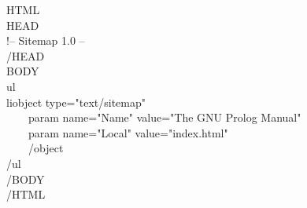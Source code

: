 \documentclass{article}
\newcommand{\Tag}[1]{{\lt}#1{\gt}}
\renewenvironment{tocenv}{\Tag{ul}\\}{\Tag{/ul}\\}
\newcommand{\OneEntry}[2]{%
\Tag{li}\Tag{object type="text/sitemap"}\\%
~~~~\Tag{param name="Name" value="{\def\\{}#2}"}\\%
~~~~\Tag{param name="Local" value="#1"}\\%
~~~~\Tag{/object}\\}
\begin{document}
\Tag{HTML}\\
\Tag{HEAD}\\
\Tag{!-- Sitemap 1.0 --}\\
\Tag{/HEAD}\\
\Tag{BODY}\\
\begin{tocenv}
\OneEntry{index.html}{The GNU Prolog Manual}

%
\end{tocenv}
\Tag{/BODY}\\
\Tag{/HTML}\\
\end{document}
